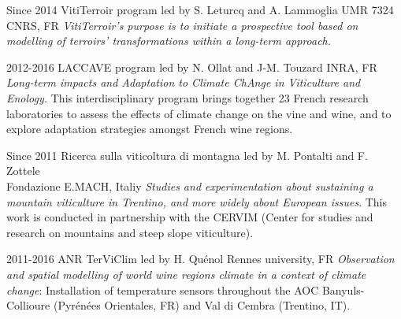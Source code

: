 \documentclass[]{cv-etienne}
\begin{document}
\begin{entrylist}
\entry
{Since 2014}
{VitiTerroir program {\normalfont led by S. Leturcq and A. Lammoglia}}
{UMR 7324 CNRS, FR}
{\emph{VitiTerroir's purpose is to initiate a prospective tool based on modelling of terroirs' transformations within a long-term approach.}}
\end{entrylist}
\begin{entrylist}
\entry
{2012-2016}
{LACCAVE program {\normalfont led by N. Ollat and J-M. Touzard}}
{INRA, FR}
{\emph{Long-term impacts and Adaptation to Climate ChAnge in Viticulture and Enology.} This interdisciplinary program brings together 23 French research laboratories to assess the effects of climate change on the vine and wine, and to explore adaptation strategies amongst French wine regions. }
\end{entrylist}
\begin{entrylist}
\entry
{Since 2011}
{Ricerca sulla viticoltura di montagna  {\normalfont  led by M. Pontalti and F. Zottele \\}}
{ Fondazione E.MACH, Italiy}
{\emph{Studies and experimentation about sustaining a mountain viticulture in Trentino, and more widely about European issues}.
This work is conducted in partnership with the CERVIM (Center for studies and research on mountains and steep slope viticulture).}
\end{entrylist}
\begin{entrylist}
\entry
{2011-2016}
{ANR TerViClim {\normalfont led by H. Quénol}}
{ Rennes university, FR}
{\emph{Observation and spatial modelling of world wine regions climate in a context of climate change}:
Installation of temperature sensors throughout the AOC Banyuls-Collioure (Pyrénées Orientales, FR) and Val di Cembra (Trentino, IT).}
\end{entrylist}
\end{document}
